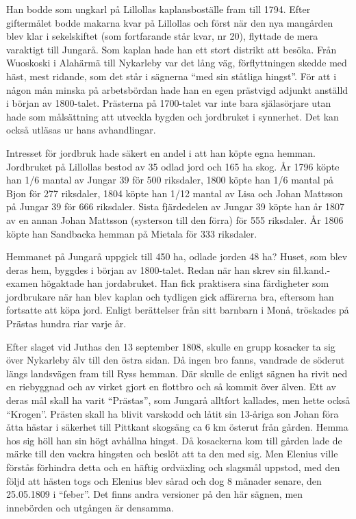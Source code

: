 Han bodde som ungkarl på Lillollas kaplansboställe fram till 1794. Efter giftermålet bodde makarna kvar på Lillollas och först när den nya mangården blev klar i sekelskiftet (som fortfarande står kvar, nr 20), flyttade de mera varaktigt till Jungarå. Som kaplan hade han ett stort distrikt att besöka. Från Wuoskoski i Alahärmä till Nykarleby var det lång väg, förflyttningen skedde med häst, mest ridande, som det står i sägnerna ``med sin ståtliga hingst''. För att i någon mån minska på arbetsbördan hade han en egen prästvigd adjunkt anställd i början av 1800-talet. Prästerna på 1700-talet var inte bara själasörjare utan hade som målsättning att utveckla bygden och jordbruket i synnerhet. Det kan också utläsas ur hans avhandlingar.

Intresset för jordbruk hade säkert en andel i att han köpte egna 	hemman. Jordbruket på Lillollas bestod av 35 odlad jord och 165 ha skog. År	1796 köpte han 1/6 mantal av Jungar 39 för 500 riksdaler, 1800 	köpte han 1/6 mantal på Bjon för 277 riksdaler, 1804 köpte han 1/12 	mantal av Lisa och Johan Mattsson på Jungar 39 för 666 riksdaler. Sista fjärdedelen av Jungar 39 köpte han år 1807 av en annan Johan Mattsson (systerson till den förra) för 555 riksdaler. År 1806 köpte han 	Sandbacka hemman på Mietala för 333 riksdaler.

Hemmanet på Jungarå uppgick till 450 ha, odlade jorden 48 ha? Huset, som blev deras hem, byggdes i början av 1800-talet. Redan när han skrev sin fil.kand.-examen högaktade han jordabruket. Han fick praktisera sina färdigheter som jordbrukare när han blev kaplan och tydligen gick affärerna bra, eftersom han fortsatte att köpa jord. Enligt berättelser från sitt barnbarn i Monå, tröskades på Prästas hundra riar varje år.

Efter slaget vid Juthas den 13 september 1808, skulle en grupp kosacker ta sig över Nykarleby älv till den östra sidan. Då ingen bro fanns, vandrade de söderut längs landsvägen fram till Ryss hemman. Där skulle de enligt sägnen ha rivit ned en riebyggnad och av 	virket gjort en flottbro och så kommit över älven. Ett av deras mål skall ha varit ``Prästas'', som Jungarå alltfort kallades, men hette också ``Krogen''. Prästen skall ha blivit varskodd och låtit sin 13-åriga son Johan  föra åtta hästar i säkerhet till Pittkant skogsäng ca 6 km österut från gården. Hemma hos sig höll han sin högt avhållna 	hingst. Då kosackerna kom till gården lade de märke till den vackra hingsten och beslöt att ta den med sig. Men Elenius ville förstås förhindra detta och en häftig ordväxling och slagsmål uppstod, med den följd att hästen togs och Elenius blev sårad och dog 8 månader senare, den 25.05.1809 i ``feber''. Det finns andra versioner på den här sägnen, men innebörden och utgången är densamma.



